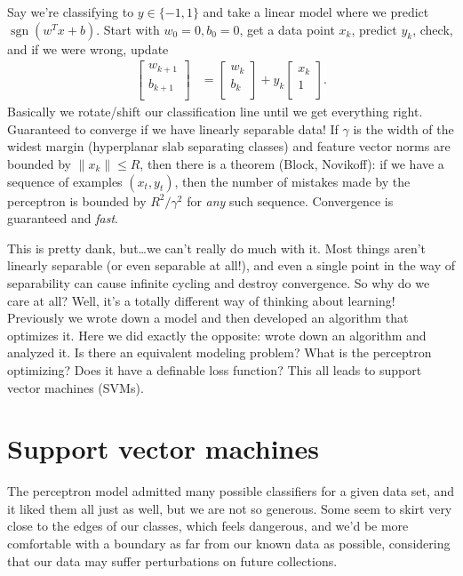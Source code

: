 \documentclass[11pt,letterpaper]{article}
\DeclareMathOperator{\sgn}{sgn}
\theoremstyle{definition}
\numberwithin{equation}{section}
\numberwithin{figure}{section}
\begin{document}
Say we're classifying to $y \in \{-1,1\}$ and take a linear model where we predict $\sgn(w^T x + b)$. Start with $w_0 = 0, b_0 = 0$, get a data point $x_k$, predict $y_k$, check, and if we were wrong, update
%
\begin{align}
	\begin{bmatrix}w_{k+1}\\b_{k+1}\\\end{bmatrix} &= \begin{bmatrix}w_k\\b_k\\\end{bmatrix} + y_k \begin{bmatrix}x_k\\1\\\end{bmatrix}.
\end{align}
%
Basically we rotate/shift our classification line until we get everything right. Guaranteed to converge if we have linearly separable data! If $\gamma$ is the width of the widest margin (hyperplanar slab separating classes) and feature vector norms are bounded by $\|x_k\| \leq R$, then there is a theorem (Block, Novikoff): if we have a sequence of examples $(x_t,y_t)$, then the number of mistakes made by the perceptron is bounded by $R^2 / \gamma^2$ for \emph{any} such sequence. Convergence is guaranteed and \emph{fast}.

This is pretty dank, but\ldots we can't really do much with it. Most things aren't linearly separable (or even separable at all!), and even a single point in the way of separability can cause infinite cycling and destroy convergence. So why do we care at all? Well, it's a totally different way of thinking about learning! Previously we wrote down a model and then developed an algorithm that optimizes it. Here we did exactly the opposite: wrote down an algorithm and analyzed it. Is there an equivalent modeling problem? What is the perceptron optimizing? Does it have a definable loss function? This all leads to support vector machines (SVMs).

















\section{Support vector machines}
The perceptron model admitted many possible classifiers for a given data set, and it liked them all just as well, but we are not so generous. Some seem to skirt very close to the edges of our classes, which feels dangerous, and we'd be more comfortable with a boundary as far from our known data as possible, considering that our data may suffer perturbations on future collections.
\end{document}

